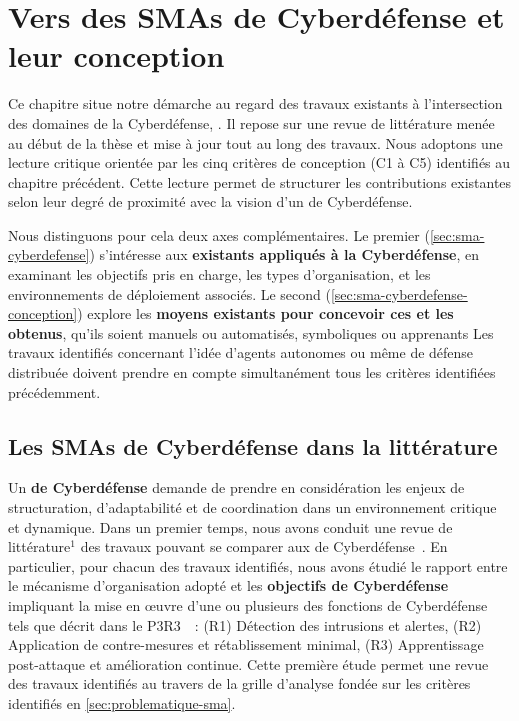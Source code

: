 \clearpage
\thispagestyle{empty}
\null
\newpage

\chapter{Vers des SMAs de Cyberdéfense et leur conception}

% 

\noindent
Ce chapitre situe notre démarche au regard des travaux existants à l'intersection des domaines de la Cyberdéfense, . Il repose sur une revue de littérature menée au début de la thèse et mise à jour tout au long des travaux.
%
Nous adoptons une lecture critique orientée par les cinq critères de conception (C1 à C5) identifiés au chapitre précédent. Cette lecture permet de structurer les contributions existantes selon leur degré de proximité avec la vision d'un  de Cyberdéfense.

Nous distinguons pour cela deux axes complémentaires. Le premier (\autoref{sec:sma-cyberdefense}) s'intéresse aux \textbf{ existants appliqués à la Cyberdéfense}, en examinant les objectifs pris en charge, les types d'organisation, et les environnements de déploiement associés. Le second (\autoref{sec:sma-cyberdefense-conception}) explore les \textbf{moyens existants pour concevoir ces  et les  obtenus}, qu'ils soient manuels ou automatisés, symboliques ou apprenants
%
Les travaux identifiés concernant l'idée d'agents autonomes ou même de défense distribuée doivent prendre en compte simultanément tous les critères identifiées précédemment.


\section{Les SMAs de Cyberdéfense dans la littérature}\label{sec:sma-cyberdefense}

Un \textbf{ de Cyberdéfense} demande de prendre en considération les enjeux de structuration, d'adaptabilité et de coordination dans un environnement critique et dynamique.
Dans un premier temps, nous avons conduit une revue de littérature$^{1}$ des travaux pouvant se comparer aux  de Cyberdéfense~\cite{soule2023ressithese}.
En particulier, pour chacun des travaux identifiés, nous avons étudié le rapport entre le mécanisme d'organisation adopté et les \textbf{objectifs de Cyberdéfense} impliquant la mise en œuvre d'une ou plusieurs des fonctions de Cyberdéfense tels que décrit dans le P3R3~\cite{Theron2013P3R3}~:
(R1) Détection des intrusions et alertes,
(R2) Application de contre-mesures et rétablissement minimal,
(R3) Apprentissage post-attaque et amélioration continue.
Cette première étude permet une revue des travaux identifiés au travers de la grille d'analyse fondée sur les critères identifiés en \autoref{sec:problematique-sma}.

